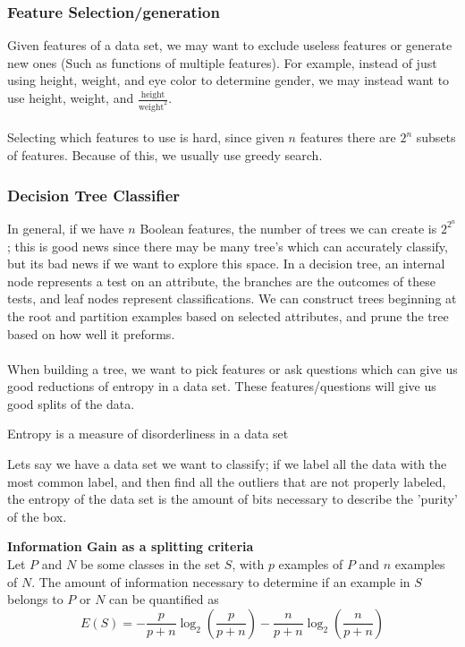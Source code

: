 \documentclass{chezarticle}
\begin{document}
\subsubsection{Feature Selection/generation}
Given features of a data set, we may want to exclude useless features or generate new ones (Such as functions of multiple features). For example, instead of just using height, weight, and eye color to determine gender, we may instead want to use height, weight, and $\frac{\text{height}}{\text{weight}^2}$.\\
\\
Selecting which features to use is hard, since given $n$ features there are $2^n$ subsets of features. Because of this, we usually use greedy search. 
\subsubsection{Decision Tree Classifier}
In general, if we have $n$ Boolean features, the number of trees we can create is $2^{2^n}$; this is good news since there may be many tree's which can accurately classify, but its bad news if we want to explore this space. In a decision tree, an internal node represents a test on an attribute, the branches are the outcomes of these tests, and leaf nodes represent classifications. We can construct trees beginning at the root and partition examples based on selected attributes, and prune the tree based on how well it preforms.
\\
\\
When building a tree, we want to pick features or ask questions which can give us good reductions of entropy in a data set. These features/questions will give us good splits of the data.
\begin{definition}
Entropy is a measure of disorderliness in a data set
\end{definition}
Lets say we have a data set we want to classify; if we label all the data with the most common label, and then find all the outliers that are not properly labeled, the entropy of the data set is the amount of bits necessary to describe the 'purity' of the box.
\begin{definition}
\textbf{Information Gain as a splitting criteria}\\
Let $P$ and $N$ be some classes in the set $S$, with $p$ examples of $P$ and $n$ examples of $N$. The amount of information necessary to determine if an example in $S$ belongs to $P$ or $N$ can be quantified as
$$E(S) = -\frac{p}{p+n}\log_2(\frac{p}{p+n}) - \frac{n}{p+n}\log_2(\frac{n}{p+n})$$
\end{definition}
\end{document}

